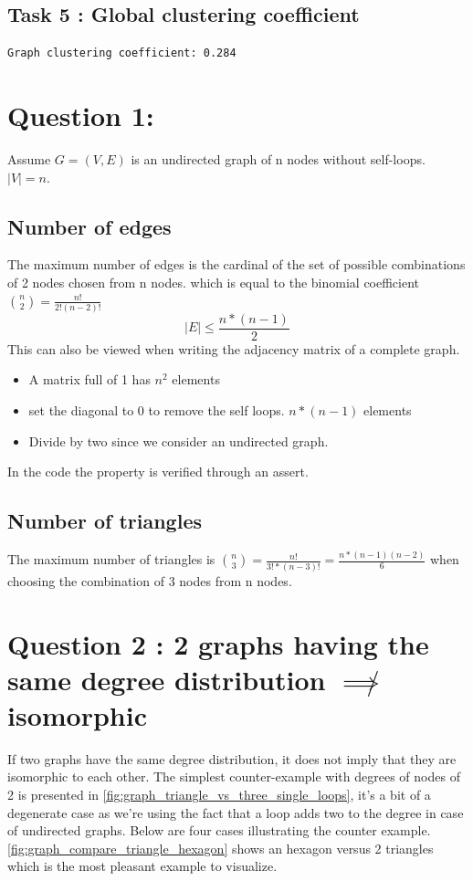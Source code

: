 \documentclass[a4paper]{article}
\begin{document}
\subsection*{Task 5 : Global clustering coefficient}
\begin{verbatim}
Graph clustering coefficient: 0.284
\end{verbatim}


\section{Question 1:}
Assume $G = (V, E)$ is an undirected graph of n nodes without self-loops. $|V|=n$.
\subsection*{Number of edges}
The maximum number of edges is the cardinal of the set of possible combinations of 2 nodes chosen from n nodes.
which is equal to the binomial coefficient $\binom{n}{2} = \frac{n!}{2! (n-2)!}$
\begin{equation}\label{eq 1.1}
|E| \leq \frac{n*(n-1)}{2}
\end{equation}
This can also be viewed when writing the adjacency matrix of a complete graph.
\begin{itemize}
    \item  A matrix full of 1 has $n^2$ elements
    \item set the diagonal to 0 to remove the self loops. $n*(n-1)$ elements
    \item Divide by two since we consider an undirected graph.
\end{itemize}


In the code the property is verified through an assert.

\subsection*{Number of triangles}
The maximum number of triangles is $\binom{n}{3} = \frac{n!}{3! * (n-3)!} = \frac{n*(n-1)(n-2)}{6}$ 
when choosing the combination of 3 nodes from n nodes.


\section{Question 2 : 2 graphs having the same degree distribution $\not \implies$ isomorphic}
If two graphs have the same degree distribution, it does not imply that they are isomorphic to each other.
The simplest counter-example with degrees of nodes of 2 is presented 
in \ref{fig:graph_triangle_vs_three_single_loops},
it's a bit of a degenerate case as we're using the fact that a loop adds two to the degree in case of undirected graphs.
Below are four cases illustrating the counter example.
\ref{fig:graph_compare_triangle_hexagon} shows an hexagon versus 2 triangles 
which is the most pleasant example to visualize.
\end{document}
